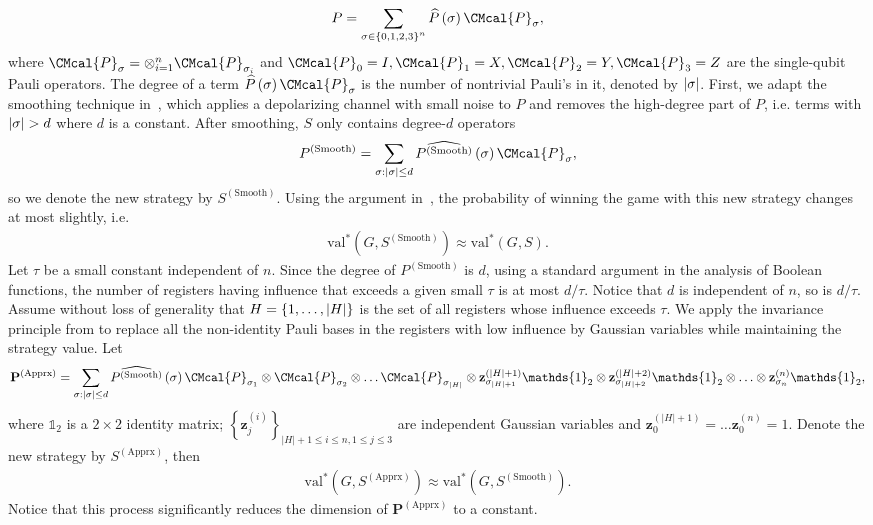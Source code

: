 \documentclass[10pt,a4paper]{article}
\def\P{\CMcal{P}}
\theoremstyle{plain}
\theoremstyle{definition}
\newcommand {\set} [1] {\ensuremath{ \left\lbrace #1 \right\rbrace }}
\newcommand {\br} [1] {\ensuremath{ \left( #1 \right) }}
\DeclarePairedDelimiter{\abs}{\lvert}{\rvert}
\newcommand {\id} {\ensuremath{\mathds{1}}}
\newcommand{\randP}{\ensuremath{\mathbf{P}}}
\newcommand{\randz}{\ensuremath{\mathbf{z}}}
\newcommand{\1}{\mathbb{1}} %
\newcommand{\val}{\mathrm{val}}
\begin{document}
\[P=\sum_{\sigma\in\set{0,1,2,3}^n}\widehat{P}\br{\sigma}\P_{\sigma},\]
where $\P_{\sigma}=\otimes_{i=1}^n\P_{\sigma_i}$ and $\P_0=I,\P_1=X,\P_2=Y,\P_3=Z$ are the single-qubit Pauli operators.
The degree of a term $\widehat{P}\br{\sigma}\P_{\sigma}$ is the number of nontrivial Pauli's in it, denoted by $\abs{\sigma}$.
First, we adapt the smoothing technique in~\cite{qin2021nonlocal}, which applies a depolarizing channel with small noise to $P$ and removes the high-degree part of $P$, i.e. terms with $\abs{\sigma} > d$ where $d$ is a constant.  
After smoothing, $S$ only contains degree-$d$ operators 
\[P^{(\textrm{Smooth})}=\sum_{\sigma:\abs{\sigma}\leq d}\widehat{P^{(\textrm{Smooth})}}\br{\sigma}\P_{\sigma},\]
so we denote the new strategy by $S^{(\textrm{Smooth})}$.
Using the argument in~\cite{qin2021nonlocal}, the probability of winning the game with this new strategy changes at most slightly, i.e.
\begin{align*}
    \val^*(G, S^{(\textrm{Smooth})}) \approx \val^*(G, S).
\end{align*}
Let $\tau$ be a small constant independent of $n$. Since the degree of $P^{(\textrm{Smooth})}$ is $d$, using a standard argument in the analysis of Boolean functions, the number of registers having influence that exceeds a given small $\tau$ is at most $d/\tau$. Notice that $d$ is independent of $n$, so is $d/\tau$. 
Assume without loss of generality that $H=\set{1,\ldots, \abs{H}}$ is the set of all registers whose influence exceeds $\tau$. 
We apply the invariance principle from \cite{qin2021nonlocal} to replace all the non-identity Pauli bases in the registers with low influence by Gaussian variables while maintaining the strategy value.
Let
\[\randP^{(\textrm{Apprx})}=\sum_{\sigma:\abs{\sigma}\leq d}\widehat{P^{(\textrm{Smooth})}}\br{\sigma}\P_{\sigma_1}\otimes\P_{\sigma_2}\otimes\ldots\P_{\sigma_{|H|}}\otimes \randz^{(\abs{H}+1)}_{\sigma_{\abs{H}+1}}\id_2\otimes\randz^{(\abs{H}+2)}_{\sigma_{\abs{H}+2}}\id_2\otimes\ldots\otimes\randz^{(n)}_{\sigma_n}\id_2,\]
where $\id_2$ is a $2\times 2$ identity matrix; $\set{\randz^{(i)}_j}_{|H|+1\leq i\leq n, 1\leq j\leq 3}$ are independent Gaussian variables and $\randz^{(|H|+1)}_0=\ldots\randz^{(n)}_0=1$.
Denote the new strategy by $S^{(\textrm{Apprx})}$, then  
\begin{align*}
    \val^*(G, S^{(\textrm{Apprx})}) \approx \val^*(G, S^{(\textrm{Smooth})}).
\end{align*}
Notice that this process significantly reduces the dimension of $\randP^{(\textrm{Apprx})}$ to a constant.
\end{document}
